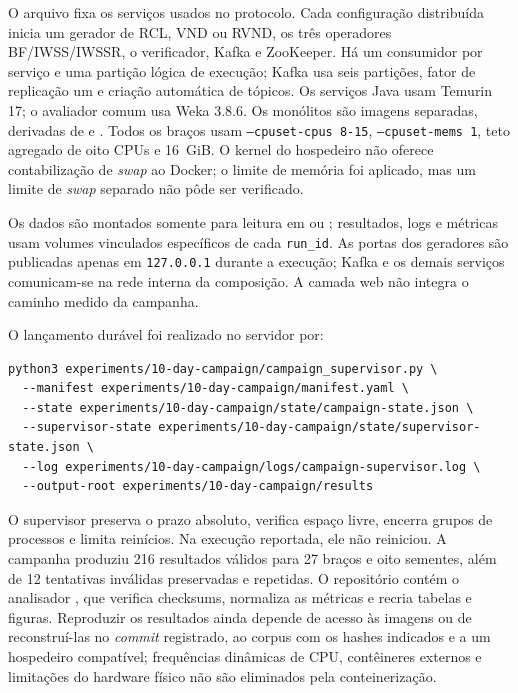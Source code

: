 O arquivo  fixa os serviços usados no protocolo. Cada configuração distribuída inicia um gerador de RCL, VND ou RVND, os três operadores BF/IWSS/IWSSR, o verificador, Kafka e ZooKeeper. Há um consumidor por serviço e uma partição lógica de execução; Kafka usa seis partições, fator de replicação um e criação automática de tópicos. Os serviços Java usam Temurin 17; o avaliador comum usa Weka 3.8.6. Os monólitos são imagens separadas, derivadas de  e . Todos os braços usam \texttt{--cpuset-cpus 8-15}, \texttt{--cpuset-mems 1}, teto agregado de oito CPUs e 16~GiB. O kernel do hospedeiro não oferece contabilização de \textit{swap} ao Docker; o limite de memória foi aplicado, mas um limite de \textit{swap} separado não pôde ser verificado.

Os dados são montados somente para leitura em  ou ; resultados, logs e métricas usam volumes vinculados específicos de cada \texttt{run\_id}. As portas dos geradores são publicadas apenas em \texttt{127.0.0.1} durante a execução; Kafka e os demais serviços comunicam-se na rede interna da composição. A camada web não integra o caminho medido da campanha.

O lançamento durável foi realizado no servidor por:

\begin{lstlisting}[basicstyle=\ttfamily\footnotesize,breaklines=true,columns=fullflexible]
python3 experiments/10-day-campaign/campaign_supervisor.py \
  --manifest experiments/10-day-campaign/manifest.yaml \
  --state experiments/10-day-campaign/state/campaign-state.json \
  --supervisor-state experiments/10-day-campaign/state/supervisor-state.json \
  --log experiments/10-day-campaign/logs/campaign-supervisor.log \
  --output-root experiments/10-day-campaign/results
\end{lstlisting}

O supervisor preserva o prazo absoluto, verifica espaço livre, encerra grupos de processos e limita reinícios. Na execução reportada, ele não reiniciou. A campanha produziu 216 resultados válidos para 27 braços e oito sementes, além de 12 tentativas inválidas preservadas e repetidas. O repositório contém o analisador , que verifica checksums, normaliza as métricas e recria tabelas e figuras. Reproduzir os resultados ainda depende de acesso às imagens ou de reconstruí-las no \textit{commit} registrado, ao corpus com os hashes indicados e a um hospedeiro compatível; frequências dinâmicas de CPU, contêineres externos e limitações do hardware físico não são eliminados pela conteinerização.

